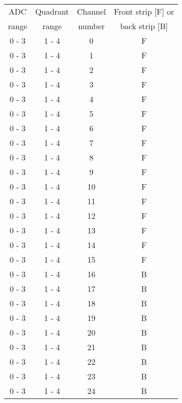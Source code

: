 \begin{tabular}{cccc}
\hline
ADC    & Quadrant & Channel & Front strip [F] or   \\
range  & range    & number  & back strip [B]       \\
\hline
0 - 3  &  1 - 4   &  0      &  F                   \\
0 - 3  &  1 - 4   &  1      &  F                   \\
0 - 3  &  1 - 4   &  2      &  F                   \\
0 - 3  &  1 - 4   &  3      &  F                   \\
0 - 3  &  1 - 4   &  4      &  F                   \\
0 - 3  &  1 - 4   &  5      &  F                   \\
0 - 3  &  1 - 4   &  6      &  F                   \\
0 - 3  &  1 - 4   &  7      &  F                   \\
0 - 3  &  1 - 4   &  8      &  F                   \\
0 - 3  &  1 - 4   &  9      &  F                   \\
0 - 3  &  1 - 4   &  10     &  F                   \\
0 - 3  &  1 - 4   &  11     &  F                   \\
0 - 3  &  1 - 4   &  12     &  F                   \\
0 - 3  &  1 - 4   &  13     &  F                   \\
0 - 3  &  1 - 4   &  14     &  F                   \\
0 - 3  &  1 - 4   &  15     &  F                   \\
0 - 3  &  1 - 4   &  16     &  B                   \\
0 - 3  &  1 - 4   &  17     &  B                   \\
0 - 3  &  1 - 4   &  18     &  B                   \\
0 - 3  &  1 - 4   &  19     &  B                   \\
0 - 3  &  1 - 4   &  20     &  B                   \\
0 - 3  &  1 - 4   &  21     &  B                   \\
0 - 3  &  1 - 4   &  22     &  B                   \\
0 - 3  &  1 - 4   &  23     &  B                   \\
0 - 3  &  1 - 4   &  24     &  B                   \\

\end{tabular}
